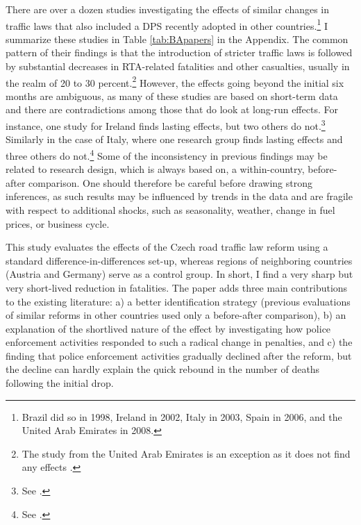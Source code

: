 \documentclass[12pt]{article}
\begin{document}
There are over a dozen studies investigating the effects of similar changes in
traffic laws that also included a DPS recently adopted in other
countries.\footnote{Brazil did so in 1998, Ireland in 2002, Italy in 2003, Spain
  in 2006, and the United Arab Emirates in 2008. } I summarize these studies in
Table \ref{tab:BApapers} in the Appendix. The common pattern of their findings
is that the introduction of stricter traffic laws is followed by substantial
decreases in RTA-related fatalities and other casualties, usually in the realm
of 20 to 30 percent.\footnote{The study from the United Arab Emirates is an
  exception as it does not find any effects \citep{mehmood_evaluating_2010}.}
However, the effects going beyond the initial six months are ambiguous, as many
of these studies are based on short-term data and there are contradictions among
those that do look at long-run effects.  For instance, one study for Ireland
finds lasting effects, but two others do not.\footnote{See
  \citet{butler_trends_2006,healy_speed_2004,hussain_speeding_2006}.} Similarly
in the case of Italy, where one research group finds lasting effects and three
others do not.\footnote{See
  \citet{nicita_rational_2009,farchi_evaluation_2007,istat_instituto_nazionale_di_statistica_statistica_2005,zambon_evidence-based_2007,zambon_sustainability_2008}.}
Some of the inconsistency in previous findings may be related to research
design, which is always based on, a within-country, before-after comparison. One
should therefore be careful before drawing strong inferences, as such results
may be influenced by trends in the data and are fragile with respect to
additional shocks, such as seasonality, weather, change in fuel prices, or
business cycle.  

This study evaluates the effects of the Czech road traffic law reform using a
standard difference-in-differences set-up, whereas regions of neighboring
countries (Austria and Germany) serve as a control group. In short, I find a
very sharp but very short-lived reduction in fatalities. The paper adds three
main contributions to the existing literature: a) a better identification
strategy (previous evaluations of similar reforms in other countries used only a
before-after comparison), b) an explanation of the shortlived nature of the
effect by investigating how police enforcement activities responded to such a
radical change in penalties, and c) the finding that police enforcement
activities gradually declined after the reform, but the decline can hardly
explain the quick rebound in the number of deaths following the initial drop.
\end{document}
